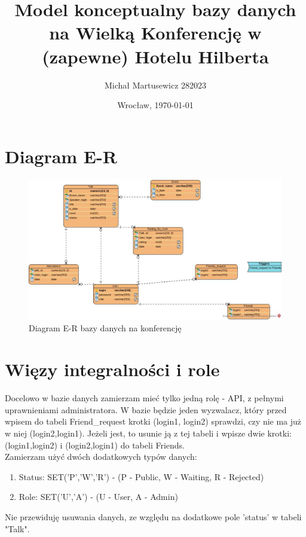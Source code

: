 \documentclass{article}
\author{Michał Martusewicz 282023}
\date{Wrocław, \today}
\title{\textbf{Model konceptualny bazy danych na Wielką Konferencję w (zapewne) Hotelu Hilberta}}
\begin{document}
\maketitle
\section{Diagram E-R}
\begin{figure}[H]
    \centering
	\includegraphics[width= 1 \textwidth]{Konferencja.jpg}
    \caption{Diagram E-R bazy danych na konferencję}
 	\label{diagram}
\end{figure}
\section{Więzy integralności i role}
Docelowo w bazie danych zamierzam mieć tylko jedną rolę - API, z pełnymi uprawnieniami administratora.
W bazie będzie jeden wyzwalacz, który przed wpisem do tabeli Friend\_request krotki (login1, login2) sprawdzi, czy nie ma już w niej (login2,login1). Jeżeli jest, to usunie ją z tej tabeli i wpisze dwie krotki: (login1,login2) i (login2,login1) do tabeli Friends.\\
Zamierzam użyć dwóch dodatkowych typów danych:
\begin{enumerate}
\item Status: SET('P','W','R') - (P - Public, W - Waiting, R - Rejected)
\item Role: SET('U','A') - (U -  User, A - Admin)
\end{enumerate}
Nie przewiduję usuwania danych, ze względu na dodatkowe pole 'status' w tabeli "Talk".
\end{document}
